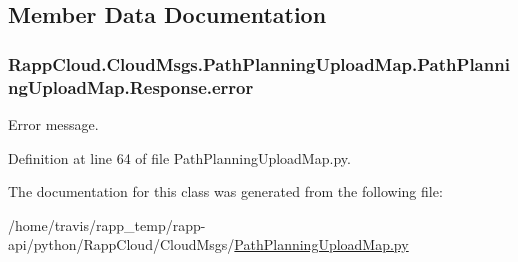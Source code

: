 \subsection{Member Data Documentation}
\hypertarget{classRappCloud_1_1CloudMsgs_1_1PathPlanningUploadMap_1_1PathPlanningUploadMap_1_1Response_a0d6b31fb1e7584f13b9d27783203035f}{
\subsubsection[{error}]{\setlength{\rightskip}{0pt plus 5cm}Rapp\-Cloud.\-Cloud\-Msgs.\-Path\-Planning\-Upload\-Map.\-Path\-Planning\-Upload\-Map.\-Response.\-error}}\label{classRappCloud_1_1CloudMsgs_1_1PathPlanningUploadMap_1_1PathPlanningUploadMap_1_1Response_a0d6b31fb1e7584f13b9d27783203035f}


Error message. 



Definition at line 64 of file Path\-Planning\-Upload\-Map.\-py.



The documentation for this class was generated from the following file\-:\begin{DoxyCompactItemize}
\item 
/home/travis/rapp\-\_\-temp/rapp-\/api/python/\-Rapp\-Cloud/\-Cloud\-Msgs/\hyperlink{PathPlanningUploadMap_8py}{Path\-Planning\-Upload\-Map.\-py}\end{DoxyCompactItemize}
